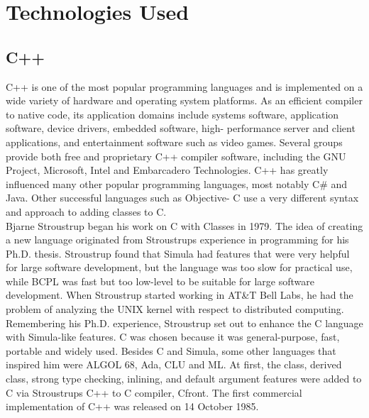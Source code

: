 \section{Technologies Used}
\subsection{C++}
\noindent C++ is one of the most popular programming languages and is implemented on a wide variety of hardware and operating system platforms. As an efficient compiler to native code, its application domains include systems software, application software, device drivers, embedded software, high- performance server and client applications, and entertainment software such as video games. Several groups provide both free and proprietary C++ compiler software, including the GNU Project, Microsoft, Intel and Embarcadero Technologies. C++ has greatly influenced many other
popular programming languages, most notably C\# and Java. Other successful languages such as Objective- C use a very different syntax and approach to adding classes to C.\\

\noindent Bjarne Stroustrup began his work on C with Classes in 1979. The idea of creating a new language originated from Stroustrups experience in programming for his Ph.D. thesis. Stroustrup found that Simula had features that were very helpful for large software development, but the language was too slow for practical use, while BCPL was fast but too low-level to be suitable for large software development. When Stroustrup started working in AT\&T Bell Labs, he had the problem of analyzing the UNIX kernel with respect to distributed computing. Remembering his Ph.D. experience, Stroustrup set out to enhance the C language with Simula-like features. C was chosen because it was general-purpose, fast, portable and widely used. Besides C and Simula, some other languages
that inspired him were ALGOL 68, Ada, CLU and ML. At first, the class, derived class, strong type checking, inlining, and default argument features were added to C via Stroustrups C++ to C compiler, Cfront. The first commercial implementation of C++ was released on 14 October 1985.

